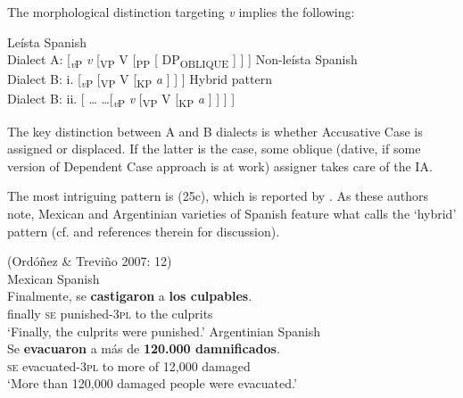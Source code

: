\documentclass[output=paper]{langsci/langscibook}
\begin{document}
The morphological distinction targeting \textit{v} implies the following:

\ea%
    \label{ex:gallego:25}
    \ea Leísta Spanish\\
     Dialect A:   [\textit{\textsubscript{v}}\textsubscript{P} \textit{v} [\textsubscript{VP} V  [\textsubscript{PP}    [ DP\textsubscript{OBLIQUE} \ConnectHead{]} ] ] ] 
    \ex Non-leísta Spanish\\
    Dialect B:  i.  [\textit{\textsubscript{v}}\textsubscript{P}  [\textsubscript{VP} V [\textsubscript{KP} \textit{a}  ] ] ]
    \ex Hybrid pattern\\
    Dialect B:  ii.   [ \ldots\xspace {} \ldots\xspace [\textit{\textsubscript{v}}\textsubscript{P} \textit{v} [\textsubscript{VP} V [\textsubscript{KP} \textit{a}  ] ] ] ]
    \z
\z    



The key distinction between A and B dialects is whether Accusative Case is assigned or displaced. If the latter is the case, some oblique (dative, if some version of  Dependent Case approach is at work) assigner takes care of the IA.

The most intriguing pattern is (25c), which is reported by \citet{Ordóñez2007}. As these authors note, Mexican and Argentinian varieties of Spanish feature what \citet{RAE-ASALE2009} calls the ‘hybrid’ pattern (cf. \citealt{Planells2017} and references therein for discussion).

\ea%
    (Ordóñez \& Treviño 2007: 12)\\
    \ea Mexican Spanish\label{ex:gallego:26}\\
    \gll Finalmente, se  \textbf{castigaron}       a  \textbf{los culpables}.        \\
         finally         \textsc{se}   punished-\textsc{3pl}   to the culprits\\
    \glt ‘Finally, the culprits were punished.’
    \ex Argentinian Spanish\\
    \gll Se  \textbf{evacuaron}    a más de \textbf{120.000 damnificados}.              \\
         \textsc{se}   evacuated-\textsc{3pl} to more of 12,000 damaged\\
    \glt  ‘More than 120,000 damaged people were evacuated.’
    \z
\z
\end{document}
